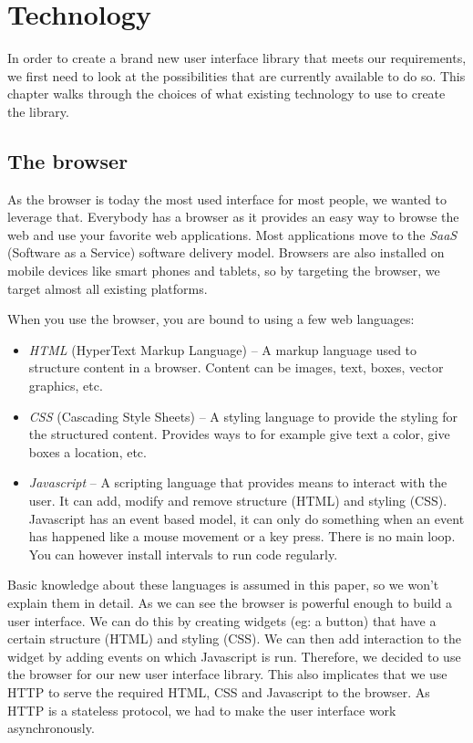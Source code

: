 \documentclass[11pt,a4paper]{article}
\begin{document}
\section{Technology}

In order to create a brand new user interface library that meets our requirements, we first need to look at the possibilities that are currently available to do so.
This chapter walks through the choices of what existing technology to use to create the library.

\subsection{The browser}

As the browser is today the most used interface for most people, we wanted to leverage that.
Everybody has a browser as it provides an easy way to browse the web and use your favorite web applications.
Most applications move to the \textit{SaaS} (Software as a Service) software delivery model.
Browsers are also installed on mobile devices like smart phones and tablets, so by targeting the browser, we target almost all existing platforms.

When you use the browser, you are bound to using a few web languages:

\begin{itemize}
\item \textit{HTML} (HyperText Markup Language) -- A markup language used to structure content in a browser.
Content can be images, text, boxes, vector graphics, etc.
\item \textit{CSS} (Cascading Style Sheets) -- A styling language to provide the styling for the structured content.
Provides ways to for example give text a color, give boxes a location, etc.
\item \textit{Javascript} -- A scripting language that provides means to interact with the user.
It can add, modify and remove structure (HTML) and styling (CSS). Javascript has an event based model, it can only do something when an event has happened like a mouse movement or a key press.
There is no main loop.
You can however install intervals to run code regularly.
\end{itemize}

Basic knowledge about these languages is assumed in this paper, so we won't explain them in detail.
As we can see the browser is powerful enough to build a user interface.
We can do this by creating widgets (eg: a button) that have a certain structure (HTML) and styling (CSS).
We can then add interaction to the widget by adding events on which Javascript is run.
Therefore, we decided to use the browser for our new user interface library.
This also implicates that we use HTTP to serve the required HTML, CSS and Javascript to the browser.
As HTTP is a stateless protocol, we had to make the user interface work asynchronously.
\end{document}
